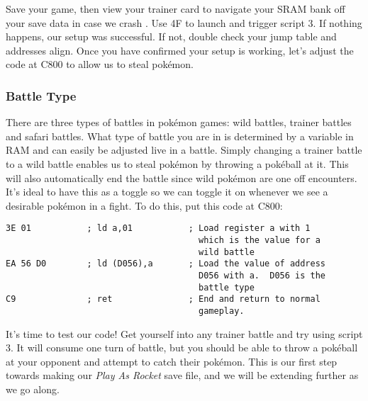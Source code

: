 \documentclass[../main.tex]{subfiles}
\begin{document}
    Save your game, then view your trainer card to navigate your SRAM bank off your save data in case we crash \cite{crashTypes}.  Use 4F to launch \timos{} and trigger script 3.  If nothing happens, our setup was successful.  If not, double check your jump table and addresses align.  Once you have confirmed your setup is working, let's adjust the code at C800 to allow us to steal pokémon.

    \subsubsection{Battle Type}
    There are three types of battles in pokémon games: wild battles, trainer battles and safari battles.  What type of battle you are in is determined by a variable in RAM and can easily be adjusted live in a battle.  Simply changing a trainer battle to a wild battle enables us to steal pokémon by throwing a pokéball at it.  This will also automatically end the battle since wild pokémon are one off encounters.  It's ideal to have this as a toggle so we can toggle it on whenever we see a desirable pokémon in a fight.  To do this, put this code at C800:

    \begin{verbatim}
3E 01           ; ld a,01           ; Load register a with 1
                                      which is the value for a
                                      wild battle
EA 56 D0        ; ld (D056),a       ; Load the value of address
                                      D056 with a.  D056 is the 
                                      battle type
C9              ; ret               ; End and return to normal
                                      gameplay.
    \end{verbatim}

    It's time to test our code!  Get yourself into any trainer battle and try using script 3.  It will consume one turn of battle, but you should be able to throw a pokéball at your opponent and attempt to catch their pokémon.  This is our first step towards making our \textit{Play As Rocket} save file, and we will be extending \timos{} further as we go along.  
\end{document}
